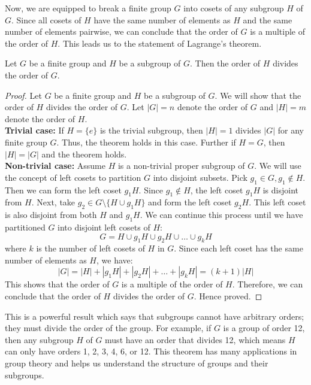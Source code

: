 \documentclass[openany]{book}
\begin{document}
Now, we are equipped to break a finite group $G$ into cosets of any subgroup $H$ of $G$. Since all cosets of $H$ have the same number of elements as $H$ and the same number of elements pairwise, we can conclude that the order of $G$ is a multiple of the order of $H$. This leads us to the statement of Lagrange's theorem.
\begin{mytheorem}
    Let \( G \) be a finite group and \( H \) be a subgroup of \( G \). Then the order of \( H \) divides the order of \( G \).
\end{mytheorem}
\begin{proof}
    Let \( G \) be a finite group and \( H \) be a subgroup of \( G \). We will show that the order of \( H \) divides the order of \( G \). Let \( |G| = n \) denote the order of \( G \) and \( |H| = m \) denote the order of \( H \). \\
    \textbf{Trivial case:} If \( H = \{ e \} \) is the trivial subgroup, then \( |H| = 1 \) divides \( |G| \) for any finite group \( G \). Thus, the theorem holds in this case. Further if $H = G$, then $|H| = |G|$ and the theorem holds. \\
    \textbf{Non-trivial case:} Assume \( H \) is a non-trivial proper subgroup of \( G \). We will use the concept of left cosets to partition \( G \) into disjoint subsets. Pick $g_1 \in G, g_1 \notin H$. Then we can form the left coset \( g_1H \). Since \( g_1 \notin H \), the left coset \( g_1H \) is disjoint from \( H \). Next, take $g_2 \in G\setminus \{H \cup g_1H\}$ and form the left coset \( g_2H \). This left coset is also disjoint from both \( H \) and \( g_1H \). We can continue this process until we have partitioned \( G \) into disjoint left cosets of \( H \):
\[G = H \cup g_1H \cup g_2H \cup \ldots \cup g_kH\]
    where \( k \) is the number of left cosets of \( H \) in \( G \). Since each left coset has the same number of elements as \( H \), we have:
    \[|G| = |H| + |g_1H| + |g_2H| + \ldots + |g_kH| = (k+1)|H|\]
    This shows that the order of \( G \) is a multiple of the order of \( H \). Therefore, we can conclude that the order of \( H \) divides the order of \( G \). Hence proved.    
\end{proof}
This is a powerful result which says that subgroups cannot have arbitrary orders; they must divide the order of the group. For example, if \( G \) is a group of order 12, then any subgroup \( H \) of \( G \) must have an order that divides 12, which means \( H \) can only have orders 1, 2, 3, 4, 6, or 12. This theorem has many applications in group theory and helps us understand the structure of groups and their subgroups.
\end{document}
